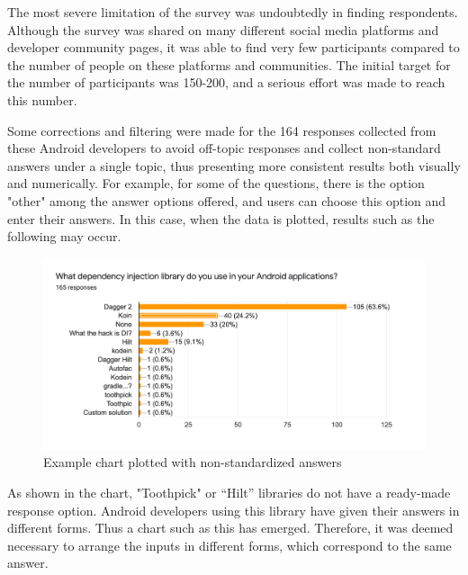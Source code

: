 The most severe limitation of the survey was undoubtedly in finding respondents. Although the survey was shared on many different social media platforms and developer community pages, it was able to find very few participants compared to the number of people on these platforms and communities. The initial target for the number of participants was 150-200, and a serious effort was made to reach this number.

Some corrections and filtering were made for the 164 responses collected from these Android developers to avoid off-topic responses and collect non-standard answers under a single topic, thus presenting more consistent results both visually and numerically. For example, for some of the questions, there is the option "other" among the answer options offered, and users can choose this option and enter their answers. In this case, when the data is plotted, results such as the following may occur.
\begin{figure}[ht!]
    \centering
    \includegraphics[scale=0.2]{figures/non_standard.png}
    \caption{Example chart plotted with non-standardized answers}
    \label{fig:non_standard_chart_example}
\end{figure}

As shown in the chart, "Toothpick" or “Hilt” libraries do not have a ready-made response option. Android developers using this library have given their answers in different forms. Thus a chart such as this has emerged. Therefore, it was deemed necessary to arrange the inputs in different forms, which correspond to the same answer. 

